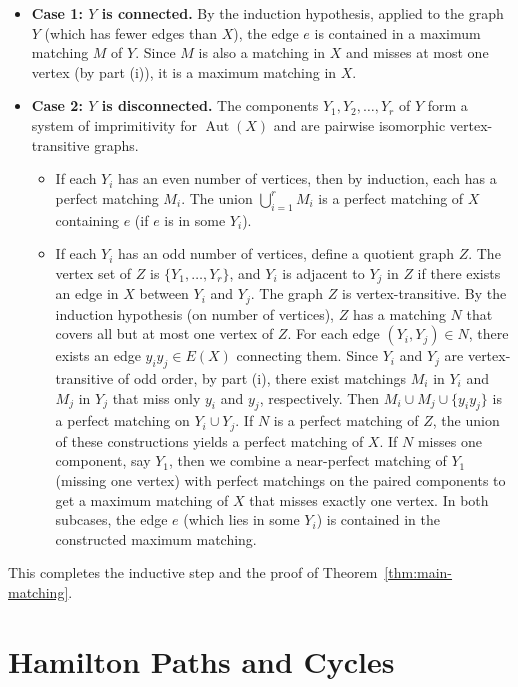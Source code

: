 \documentclass[12pt,a4paper,openany]{book}
\begin{document}
\begin{itemize}
    \item \textbf{Case 1: $Y$ is connected.} By the induction hypothesis, applied to the graph $Y$ (which has fewer edges than $X$), the edge $e$ is contained in a maximum matching $M$ of $Y$. Since $M$ is also a matching in $X$ and misses at most one vertex (by part (i)), it is a maximum matching in $X$.
    \item \textbf{Case 2: $Y$ is disconnected.} The components $Y_1, Y_2, \dots, Y_r$ of $Y$ form a system of imprimitivity for $\operatorname{Aut}(X)$ and are pairwise isomorphic vertex-transitive graphs.
    \begin{itemize}
        \item If each $Y_i$ has an even number of vertices, then by induction, each has a perfect matching $M_i$. The union $\bigcup_{i=1}^r M_i$ is a perfect matching of $X$ containing $e$ (if $e$ is in some $Y_i$).
        \item If each $Y_i$ has an odd number of vertices, define a quotient graph $Z$. The vertex set of $Z$ is $\{Y_1, \dots, Y_r\}$, and $Y_i$ is adjacent to $Y_j$ in $Z$ if there exists an edge in $X$ between $Y_i$ and $Y_j$. The graph $Z$ is vertex-transitive. By the induction hypothesis (on number of vertices), $Z$ has a matching $N$ that covers all but at most one vertex of $Z$.
        For each edge $(Y_i, Y_j) \in N$, there exists an edge $y_iy_j \in E(X)$ connecting them. Since $Y_i$ and $Y_j$ are vertex-transitive of odd order, by part (i), there exist matchings $M_i$ in $Y_i$ and $M_j$ in $Y_j$ that miss only $y_i$ and $y_j$, respectively. Then $M_i \cup M_j \cup \{y_iy_j\}$ is a perfect matching on $Y_i \cup Y_j$.
        If $N$ is a perfect matching of $Z$, the union of these constructions yields a perfect matching of $X$. If $N$ misses one component, say $Y_1$, then we combine a near-perfect matching of $Y_1$ (missing one vertex) with perfect matchings on the paired components to get a maximum matching of $X$ that misses exactly one vertex. In both subcases, the edge $e$ (which lies in some $Y_i$) is contained in the constructed maximum matching.
    \end{itemize}
\end{itemize}
This completes the inductive step and the proof of Theorem~\ref{thm:main-matching}.




\section{Hamilton Paths and Cycles}
\end{document}
